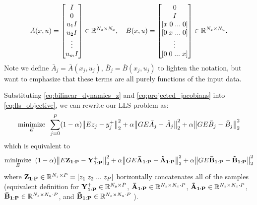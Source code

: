 \documentclass{article}
\begin{document}
  \begin{equation}
      \bar{A}(x,u) =  \begin{bmatrix} 
          I \\ 0 \\ u_1 I \\ u_2 I \\ \vdots \\ u_m I 
      \end{bmatrix} \in \mathbb{R}^{N_z \times N_x}, \quad
      \bar{B}(x,u) = \begin{bmatrix} 
          0 \\ 
          I \\ 
          [x \; 0 \; ... \; 0] \\
          [0 \; x \; ... \; 0] \\
          \vdots \\
          [0 \; 0 \; ... \; x] \\
      \end{bmatrix} \in \mathbb{R}^{N_z \times N_u}.
  \end{equation}
  Note we define $\bar{A}_j = \bar{A}(x_j,u_j)$, $\bar{B}_j = \bar{B}(x_j,u_j)$ to lighten 
  the notation, but want to emphasize that these terms are all purely functions of the input
  data.

  Substituting \eqref{eq:bilinear_dynamics_z} and \eqref{eq:projected_jacobians} into
  \eqref{eq:lls_objective}, we can rewrite our LLS problem as:
  \begin{align}
      \underset{E}{\text{minimize}} \;\; 
          \sum_{j=0}^P
          (1-\alpha) \norm{E z_j - y_j^+}_2^2 + 
            \alpha  \norm{G E \bar{A}_j - \tilde{A}_j}_2^2 + 
            \alpha  \norm{G E \bar{B}_j - \tilde{B}_j}_2^2 
  \end{align}
  which is equivalent to
  \begin{align} \label{opt:lls_matrices}
      \underset{E}{\text{minimize}} \;\; 
          (1-\alpha) \norm{E \mathbf{Z_{1:P}} - \mathbf{Y^+_{1:P}} }_2^2 + 
            \alpha  \norm{G E \mathbf{\bar{A}_{1:P}} - \mathbf{\tilde{A}_{1:P}}}_2^2 + 
            \alpha  \norm{G E \mathbf{\bar{B}_{1:P}} - \mathbf{\tilde{B}_{1:P}}}_2^2
  \end{align}
  where $\mathbf{Z_{1:P}} \in \mathbb{R}^{N_z \times P} = [z_1 \; z_2 \; ... \; z_P]$ horizontally
  concatenates all of the samples (equivalent definition for 
  $\mathbf{Y^+_{1:P}} \in \mathbb{R}^{N_y \times P}$, 
  $\mathbf{\bar{A}_{1:P}} \in \mathbb{R}^{N_z \times N_x \cdot P}$, 
  $\mathbf{\tilde{A}_{1:P}} \in \mathbb{R}^{N_z \times N_x \cdot P}$,
  $\mathbf{\bar{B}_{1:P}} \in \mathbb{R}^{N_z \times N_u \cdot P}$, and 
  $\mathbf{\tilde{B}_{1:P}} \in \mathbb{R}^{N_z \times N_u \cdot P}$ ).
\end{document}
